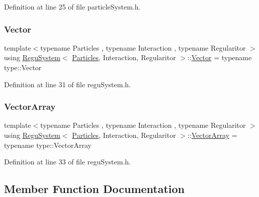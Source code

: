 Definition at line 25 of file particle\+System.\+h.

\mbox{\label{class_regu_system_a6c75e2d741a21cb84370c9eb99478cf0}} 
\subsubsection{\texorpdfstring{Vector}{Vector}}
{\footnotesize\ttfamily template$<$typename Particles , typename Interaction , typename Regularitor $>$ \\
using \mbox{\hyperlink{class_regu_system}{Regu\+System}}$<$ \mbox{\hyperlink{struct_particles}{Particles}}, Interaction, Regularitor $>$\+::\mbox{\hyperlink{class_regu_system_a6c75e2d741a21cb84370c9eb99478cf0}{Vector}} =  typename type\+::\+Vector}



Definition at line 31 of file regu\+System.\+h.

\mbox{\label{class_regu_system_aee47d9ea108b683a9cad9193c42786b6}} 
\subsubsection{\texorpdfstring{Vector\+Array}{VectorArray}}
{\footnotesize\ttfamily template$<$typename Particles , typename Interaction , typename Regularitor $>$ \\
using \mbox{\hyperlink{class_regu_system}{Regu\+System}}$<$ \mbox{\hyperlink{struct_particles}{Particles}}, Interaction, Regularitor $>$\+::\mbox{\hyperlink{class_regu_system_aee47d9ea108b683a9cad9193c42786b6}{Vector\+Array}} =  typename type\+::\+Vector\+Array}



Definition at line 33 of file regu\+System.\+h.



\subsection{Member Function Documentation}
\mbox{\label{class_regu_system_a6bf4ceaf04e7f86c737c2586a8657ff6}} 
